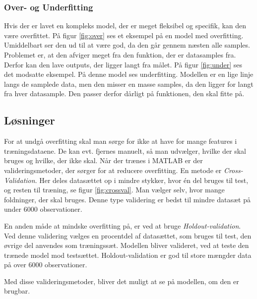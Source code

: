 \subsubsection{Over- og Underfitting}
Hvis der er lavet en kompleks model, der er meget fleksibel og specifik, kan den være overfittet. På figur \ref{fig:over}\citep{fitting} ses et eksempel på en model med overfitting. Umiddelbart ser den ud til at være god, da den går gennem næsten alle samples. Problemet er, at den afviger meget fra den funktion, der er datasamples fra. Derfor kan den lave outputs, der ligger langt fra målet. På figur \ref{fig:under} ses det modsatte eksempel. På denne model ses underfitting. Modellen er en lige linje langs de samplede data, men den misser en masse samples, da den ligger for langt fra hver datasample. Den passer derfor dårligt på funktionen, den skal fitte på.


\subsection{Løsninger}
For at undgå overfitting skal man sørge for ikke at have for mange features i træningsdataene. De kan evt. fjernes manuelt, så man udvælger, hvilke der skal bruges og hvilke, der ikke skal.
Når der trænes i MATLAB er der valideringsmetoder, der sørger for at reducere overfitting. En metode er \textit{Cross-Validation}. Her deles datasættet op i mindre stykker, hvor én del bruges til test, og resten til træning, se figur \ref{fig:crossval}. Man vælger selv, hvor mange foldninger, der skal bruges. Denne type validering er bedst til mindre datasæt på under 6000 observationer.


En anden måde at mindske overfitting på, er ved at bruge \textit{Holdout-validation}. Ved denne validering vælges en procentdel af datasættet, som bruges til test, den øvrige del anvendes som træningssæt. Modellen bliver valideret, ved at teste den trænede model mod testsættet. Holdout-validation er god til store mængder data på over 6000 observationer.

Med disse valideringsmetoder, bliver det muligt at se på modellen, om den er brugbar.